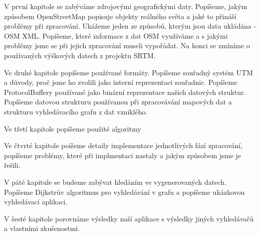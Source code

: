 
V první kapitole se zabýváme zdrojovými geografickými daty. Popíšeme, jakým
způsobem OpenStreetMap popisuje objekty reálného světa a jaké to přináší
problémy při zpracování. Ukážeme jeden ze způsobů, kterým jsou data ukládána -
OSM XML. Popíšeme, které informace z dat OSM využíváme a s jakými problémy jsme
se při jejich zpracování museli vypořádat. Na konci se zmíníme o používaných
výškových datech z projektu SRTM.

Ve druhé kapitole popíšeme používané formáty. Popíšeme souřadný systém UTM a
důvody, proč jsme ho zvolili jako interní reprezentaci souřadnic. Popíšeme
ProtocolBuffery používané jako binární reprezentace našich datových struktur.
Popíšeme datovou strukturu používanou při zpracovávání mapových dat a strukturu
vyhledávacího grafu z dat vzniklého.

Ve třetí kapitole popíšeme použité algoritmy

Ve čtvrté kapitole poíšeme detaily implementace jednotlivých fází zpracování,
popíšeme problémy, které při implmentaci nastaly a jakým způsobem jsme je
řešili. 

V páté kapitule se budeme zabývat hledáním ve vygenerovaných datech. Popíšeme
Dijkstrův algoritmus pro vyhledávání v grafu a popíšeme ukázkovou vyhledávací
aplikaci. 

V šesté kapitole porovnáme výsledky naší aplikace s výsledky jiných vyhledávačů
a vlastními zkušenostmi. 


